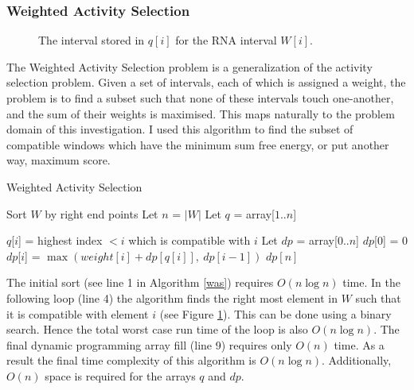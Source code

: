 \documentclass{cshonours}
\begin{document}
\subsubsection{Weighted Activity Selection}

\begin{figure}
\begin{center}
\end{center}
\caption{The interval stored in $q[i]$ for the RNA interval $W[i]$.}
\label{fig:rightcompat}
\end{figure}

The Weighted Activity Selection problem is a generalization of the activity selection problem. Given a set of intervals, each of which is assigned a weight, the problem is to find a subset such that none of these intervals touch one-another, and the sum of their weights is maximised. This maps naturally to the problem domain of this investigation. I used this algorithm to find the subset of compatible windows which have the minimum sum free energy, or put another way, maximum score.

\begin{algorithm}
  \caption{Weighted Activity Selection}
  \label{was}
  \begin{algorithmic}[1]
  \State Sort $W$ by right end points
  \State Let $n$ = $|W|$
  \State Let $q$ = array[$1..n$]
  
  	\State $q$[$i$] = highest index $< i$ which is compatible with $i$
  \EndFor
  \State Let $dp$ = array[$0..n$]  
  \State $dp$[0] = 0
  	\State $dp$[$i$] = $\max (weight[i] + dp[q[i]], \: dp[i-1])$
  \EndFor
  \State \Return $dp[n]$
  \end{algorithmic}
\end{algorithm}

The initial sort (see line 1 in Algorithm \ref{was}) requires $O(n \log n)$ time. In the following loop (line 4) the algorithm finds the right most element in $W$ such that it is compatible with element $i$ (see Figure \ref{fig:rightcompat}). This can be done using a binary search. Hence the total worst case run time of the loop is also $O(n \log n)$. The final dynamic programming array fill (line 9) requires only $O(n)$ time. As a result the final time complexity of this algorithm is $O(n \log n)$. Additionally, $O(n)$ space is required for the arrays $q$ and $dp$.
\end{document}
